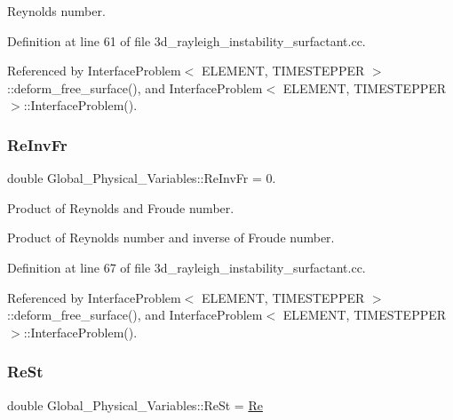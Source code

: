 Reynolds number. 



Definition at line 61 of file 3d\+\_\+rayleigh\+\_\+instability\+\_\+surfactant.\+cc.



Referenced by Interface\+Problem$<$ E\+L\+E\+M\+E\+N\+T, T\+I\+M\+E\+S\+T\+E\+P\+P\+E\+R $>$\+::deform\+\_\+free\+\_\+surface(), and Interface\+Problem$<$ E\+L\+E\+M\+E\+N\+T, T\+I\+M\+E\+S\+T\+E\+P\+P\+E\+R $>$\+::\+Interface\+Problem().

\mbox{\label{namespaceGlobal__Physical__Variables_aa6286f02b476912dd7550eced538331a}} 
\subsubsection{\texorpdfstring{Re\+Inv\+Fr}{ReInvFr}}
{\footnotesize\ttfamily double Global\+\_\+\+Physical\+\_\+\+Variables\+::\+Re\+Inv\+Fr = 0.}



Product of Reynolds and Froude number. 

Product of Reynolds number and inverse of Froude number. 

Definition at line 67 of file 3d\+\_\+rayleigh\+\_\+instability\+\_\+surfactant.\+cc.



Referenced by Interface\+Problem$<$ E\+L\+E\+M\+E\+N\+T, T\+I\+M\+E\+S\+T\+E\+P\+P\+E\+R $>$\+::deform\+\_\+free\+\_\+surface(), and Interface\+Problem$<$ E\+L\+E\+M\+E\+N\+T, T\+I\+M\+E\+S\+T\+E\+P\+P\+E\+R $>$\+::\+Interface\+Problem().

\mbox{\label{namespaceGlobal__Physical__Variables_a085ee4bf968ffdd01a41b8c41864f907}} 
\subsubsection{\texorpdfstring{Re\+St}{ReSt}}
{\footnotesize\ttfamily double Global\+\_\+\+Physical\+\_\+\+Variables\+::\+Re\+St = \hyperlink{namespaceGlobal__Physical__Variables_ab814e627d2eb5bc50318879d19ab16b9}{Re}}



